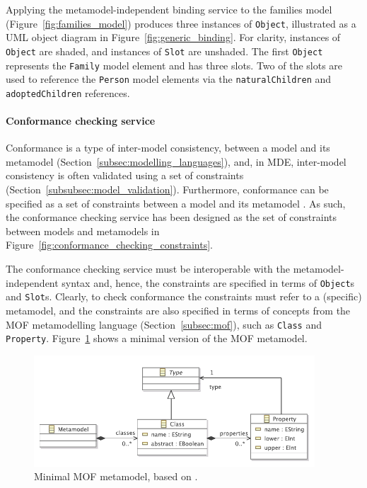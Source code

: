 Applying the metamodel-independent binding service to the families model (Figure~\ref{fig:families_model}) produces three instances of \texttt{Ob\-je\-ct}, illustrated as a UML object diagram in Figure~\ref{fig:generic_binding}. For clarity, instances of \texttt{Ob\-je\-ct} are shaded, and instances of \texttt{Sl\-ot} are unshaded. The first \texttt{Ob\-je\-ct} represents the \texttt{Fa\-mi\-ly} model element and has three slots. Two of the slots are used to reference the \texttt{Pe\-rs\-on} model elements via the \texttt{na\-tu\-r\-alCh\-il\-dr\-en} and \texttt{ad\-op\-t\-edCh\-il\-dr\-en} references. 


\paragraph{Conformance checking service} Conformance is a type of inter-model consistency, between a model and its metamodel (Section~\ref{subsec:modelling_languages}), and, in MDE, inter-model consistency is often validated using a set of constraints (Section~\ref{subsubsec:model_validation}). Furthermore, \cc conformance can be specified as a set of constraints between a model and its metamodel \cite{paige07metamodel}. As such, the conformance checking service has been designed as the set of constraints between models and metamodels in Figure~\ref{fig:conformance_checking_constraints}.

The conformance checking service must be interoperable with the me\-ta\-mo\-del-ind\-ep\-en\-de\-nt syntax and, hence, the constraints are specified in terms of \texttt{Ob\-je\-ct}s and \texttt{Sl\-ot}s. Clearly, to check conformance the constraints must refer to a (specific) metamodel, and the constraints are also specified in terms of concepts from the MOF metamodelling language (Section~\ref{subsec:mof}), such as \texttt{Class} and \texttt{Property}. Figure~\ref{fig:minimal_mof} shows a minimal version of the MOF metamodel.

\begin{figure}[p]
  \centering
  \includegraphics[width=10.5cm]{5.Implementation/images/minimal_mof.pdf}
  \caption{Minimal MOF metamodel, based on \cite{mof}.}
  \label{fig:minimal_mof}
\end{figure}

